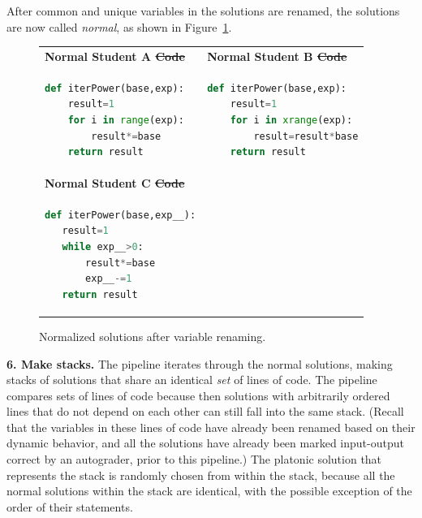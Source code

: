 \documentclass[12pt,twoside]{mitthesis}
\providecommand{\DIFaddtex}[1]{{\protect\color{blue}\uwave{#1}}} %
\providecommand{\DIFdeltex}[1]{{\protect\color{red}\sout{#1}}}                      %
\providecommand{\DIFaddFL}[1]{\DIFadd{#1}} %
\providecommand{\DIFdelFL}[1]{\DIFdel{#1}} %
\providecommand{\DIFaddbeginFL}{} %
\providecommand{\DIFaddendFL}{} %
\providecommand{\DIFdelbeginFL}{} %
\providecommand{\DIFdelendFL}{} %
\providecommand{\DIFadd}[1]{\texorpdfstring{\DIFaddtex{#1}}{#1}} %
\providecommand{\DIFdel}[1]{\texorpdfstring{\DIFdeltex{#1}}{}} %
\begin{document}
After common and unique variables in the solutions are renamed, the solutions are now called {\it normal}, as shown in Figure~\ref{fig:normalcode}.
\begin{figure}
\begin{tabular}{ll}

{\bf Normal Student A \DIFdelbeginFL \DIFdelFL{Code}\DIFdelendFL \DIFaddbeginFL \DIFaddFL{Solution}\DIFaddendFL } & {\bf Normal Student B \DIFdelbeginFL \DIFdelFL{Code}\DIFdelendFL \DIFaddbeginFL \DIFaddFL{Solution}\DIFaddendFL } \\ 

\begin{minipage}{0.5\linewidth}
\begin{lstlisting}[basicstyle=\linespread{1.0}\ttfamily\footnotesize,language=python]
def iterPower(base,exp):
    result=1
    for i in range(exp):
        result*=base
    return result
\end{lstlisting}
\end{minipage} &
\begin{minipage}{0.5\linewidth}
\begin{lstlisting}[basicstyle=\linespread{1.0}\ttfamily\footnotesize,language=python]
def iterPower(base,exp):
    result=1
    for i in xrange(exp):
        result=result*base
    return result
\end{lstlisting}
\end{minipage}
\\
{\bf Normal Student C \DIFdelbeginFL \DIFdelFL{Code}\DIFdelendFL \DIFaddbeginFL \DIFaddFL{Solution}\DIFaddendFL } &  \\
\begin{minipage}{0.5\linewidth}
\begin{lstlisting}[basicstyle=\linespread{1.0}\ttfamily\footnotesize,language=python]
def iterPower(base,exp__):
   result=1
   while exp__>0:
       result*=base
       exp__-=1
   return result
\end{lstlisting}
\end{minipage}
& \\
\end{tabular}
\caption{Normalized solutions after variable renaming.}
\label{fig:normalcode}
\end{figure}

{\bf 6. Make stacks.} The pipeline iterates through the normal solutions, making stacks of solutions that share an identical {\it set} of lines of code. The pipeline compares sets of lines of code because then solutions with arbitrarily ordered lines that do not depend on each other can still fall into the same stack. (Recall that the variables in these lines of code have already been renamed based on their dynamic behavior, and all the solutions have already been marked input-output correct by an autograder, prior to this pipeline.) The platonic solution that represents the stack is randomly chosen from within the stack, because all the normal solutions within the stack are identical, with the possible exception of the order of their statements. 
\end{document}
